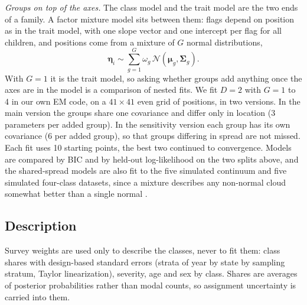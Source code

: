 \emph{Groups on top of the axes.} The class model and the trait model are the two ends of a family. A factor mixture model \citep{lubke2005} sits between them: flags depend on position as in the trait model, with one slope vector and one intercept per flag for all children, and positions come from a mixture of $G$ normal distributions,
\[
\boldsymbol{\eta}_i\sim\sum_{g=1}^{G}\omega_g\,\mathcal{N}(\boldsymbol{\mu}_g,\boldsymbol{\Sigma}_g).
\]
With $G=1$ it is the trait model, so asking whether groups add anything once the axes are in the model is a comparison of nested fits. We fit $D=2$ with $G=1$ to 4 in our own EM code, on a $41\times41$ even grid of positions, in two versions. In the main version the groups share one covariance and differ only in location ($3$ parameters per added group). In the sensitivity version each group has its own covariance ($6$ per added group), so that groups differing in spread are not missed. Each fit uses 10 starting points, the best two continued to convergence. Models are compared by BIC and by held-out log-likelihood on the two splits above, and the shared-spread models are also fit to the five simulated continuum and five simulated four-class datasets, since a mixture describes any non-normal cloud somewhat better than a single normal \citep{bauer2003}.

\subsection{Description}
Survey weights are used only to describe the classes, never to fit them: class shares with design-based standard errors (strata of year by state by sampling stratum, Taylor linearization), severity, age and sex by class. Shares are averages of posterior probabilities rather than modal counts, so assignment uncertainty is carried into them.

